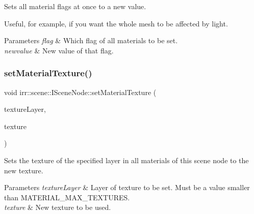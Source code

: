 Sets all material flags at once to a new value. 

Useful, for example, if you want the whole mesh to be affected by light. 
\begin{DoxyParams}{Parameters}
{\em flag} & Which flag of all materials to be set. \\
\hline
{\em newvalue} & New value of that flag. \\
\hline
\end{DoxyParams}
\mbox{\label{classirr_1_1scene_1_1ISceneNode_a0d5d2e05ebe08e6a432fbb4fd1d28dd0}} 
\subsubsection{\texorpdfstring{set\+Material\+Texture()}{setMaterialTexture()}\hspace{0.1cm}{\footnotesize\ttfamily [1/2]}}
{\footnotesize\ttfamily void irr\+::scene\+::\+I\+Scene\+Node\+::set\+Material\+Texture (\begin{DoxyParamCaption}\item[{\hyperlink{namespaceirr_a0416a53257075833e7002efd0a18e804}{u32}}]{texture\+Layer,  }\item[{\hyperlink{classirr_1_1video_1_1ITexture}{video\+::\+I\+Texture} $\ast$}]{texture }\end{DoxyParamCaption})\hspace{0.3cm}{\ttfamily [inline]}}



Sets the texture of the specified layer in all materials of this scene node to the new texture. 


\begin{DoxyParams}{Parameters}
{\em texture\+Layer} & Layer of texture to be set. Must be a value smaller than M\+A\+T\+E\+R\+I\+A\+L\+\_\+\+M\+A\+X\+\_\+\+T\+E\+X\+T\+U\+R\+ES. \\
\hline
{\em texture} & New texture to be used. \\
\hline
\end{DoxyParams}
\mbox{\label{classirr_1_1scene_1_1ISceneNode_a0d5d2e05ebe08e6a432fbb4fd1d28dd0}} 
